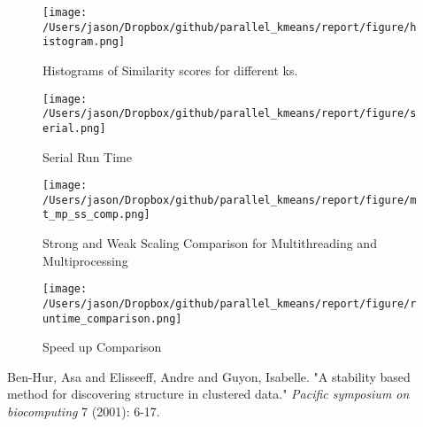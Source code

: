 \documentclass[a0paper,smallertitle]{HYposter}
\begin{document}
\begin{figure}[H] 
\texttt{[image: /Users/jason/Dropbox/github/parallel\_kmeans/report/figure/histogram.png]}
\caption{\label{fig:Histograms-of-Similarity}Histograms of Similarity scores
for different ks.}
\end{figure}


\begin{figure}[H] 
\texttt{[image: /Users/jason/Dropbox/github/parallel\_kmeans/report/figure/serial.png]}
\caption{\label{fig:Serial-Run-Time}Serial Run Time}
\end{figure}


\begin{figure}[H] 
\texttt{[image: /Users/jason/Dropbox/github/parallel\_kmeans/report/figure/mt\_mp\_ss\_comp.png]} 
\caption{\label{fig:Strong-and-Weak}Strong and Weak Scaling Comparison for
Multithreading and Multiprocessing}
\end{figure}

\begin{figure}[H] 
\texttt{[image: /Users/jason/Dropbox/github/parallel\_kmeans/report/figure/runtime\_comparison.png]}
\caption{\label{fig:Speed-up-Comparison}Speed up Comparison}
\end{figure}



\begin{thebibliography}{5}
 Ben-Hur, Asa and Elisseeff, Andre and Guyon, Isabelle. "A stability based method for discovering structure in clustered data." \emph{Pacific symposium on biocomputing} 7 (2001): 6-17.
\end{thebibliography}
\end{document}

